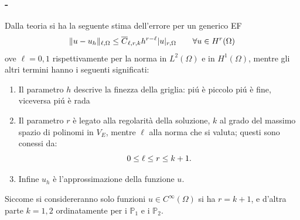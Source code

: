 \documentclass[11pt]{beamer}
\newcommand{\SpaziaturaMate}[3]{
    \setlength{\thinmuskip}{#1mu}
    \setlength{\medmuskip}{#2mu}
    \setlength{\thickmuskip}{#3mu}
}
\begin{document}
            \begin{frame}\frametitle{\insertpart{} - \insertsection{}}
                \newcommand{\sepCollaEq}{7.5pt plus 5pt minus 5pt}
                Dalla teoria si ha la seguente stima dell'errore per un generico EF
                \begin{equation*}
                    \setlength{\abovedisplayskip}{\sepCollaEq}  %
                    \setlength{\belowdisplayskip}{\sepCollaEq}  %
                    \Vert u-u_h\Vert_{\ell,\Omega}
                    \leq \overline C_{\ell,r,k}h^{r-\ell}\vert u\vert_{r,\Omega}
                    \quad\quad\forall u\in H^r(\Omega)
                    \label{eqErroreGlobaleGenerale}
                \end{equation*}
                ove $\ell=0,1$ rispettivamente per la norma in $L^2(\Omega)$ e in $H^1(\Omega)$, mentre gli altri termini hanno i seguenti significati:
                
                \begin{enumerate}[label=\arabic*.,  %
                                itemsep=2pt,        %
                                leftmargin=1cm,    %
                                rightmargin=1.5cm,
                                topsep=0pt]
                
                    \item Il parametro $h$ descrive la finezza della griglia: piú è piccolo piú è fine, viceversa piú è rada
                    
                    \item Il parametro $r$ è legato alla regolarità della soluzione, $k$ al grado del massimo spazio di polinomi in $V_E$, mentre $\ell$ alla norma che si valuta; questi sono conessi da:
                    \begin{equation*}
                        \setlength{\abovedisplayskip}{\sepCollaEq}  %
                        \setlength{\belowdisplayskip}{\sepCollaEq}  %
                        0\le\ell\le r\le k+1.
                    \end{equation*}
                    
                    \item Infine $u_h$ è l'approssimazione della funzione $u$.

                \end{enumerate}

                {\SpaziaturaMate{1}{2}{3}
                Siccome si considereranno solo funzioni $u\in C^{\infty}(\Omega)$ si ha $r=k+1$, e d'altra parte $k=1,2$ ordinatamente per i $\mathbb P_1$ e i $\mathbb P_2$.}
            \end{frame}
\end{document}
